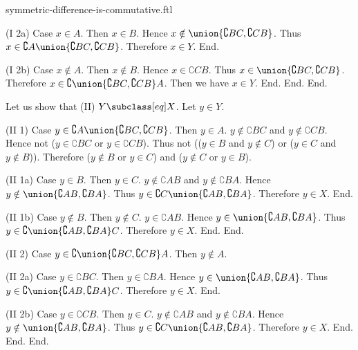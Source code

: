 \documentclass{article}
\begin{document}
\begin{smodule}[creators={Marcel Schütz}]{symmetric-difference-is-commutative.ftl}
\begin{fproof}
        (I 2a) Case $x \in A$.
          Then $x \in B$.
          Hence $x \notin \union{\complement{B}{C},\complement{C}{B}}$.
          Thus $x \in \complement{A}{\union{\complement{B}{C},\complement{C}{B}}}$.
          Therefore $x \in Y$.
        End.

        (I 2b) Case $x \notin A$.
          Then $x \notin B$.
          Hence $x \in \complement{C}{B}$.
          Thus $x \in \union{\complement{B}{C},\complement{C}{B}}$.
          Therefore $x \in \complement{\union{\complement{B}{C},\complement{C}{B}}}{A}$.
          Then we have $x \in Y$.
        End.
      End.
    End.

    Let us show that (II) $Y \subclass[eq] X$.
      Let $y \in Y$.

      (II 1) Case $y \in \complement{A}{\union{\complement{B}{C},\complement{C}{B}}}$.
        Then $y \in A$.
        $y \notin \complement{B}{C}$ and $y \notin \complement{C}{B}$.
        Hence not ($y \in \complement{B}{C}$ or $y \in \complement{C}{B}$).
        Thus not (($y \in B$ and $y \notin C$) or ($y \in C$ and $y \notin B$)).
        Therefore ($y \notin B$ or $y \in C$) and ($y \notin C$ or $y \in B$).

        (II 1a) Case $y \in B$.
          Then $y \in C$.
          $y \notin \complement{A}{B}$ and $y \notin \complement{B}{A}$.
          Hence $y \notin \union{\complement{A}{B},\complement{B}{A}}$.
          Thus $y \in \complement{C}{\union{\complement{A}{B},\complement{B}{A}}}$.
          Therefore $y \in X$.
        End.

        (II 1b) Case $y \notin B$.
          Then $y \notin C$.
          $y \in \complement{A}{B}$.
          Hence $y \in \union{\complement{A}{B},\complement{B}{A}}$.
          Thus $y \in \complement{\union{\complement{A}{B},\complement{B}{A}}}{C}$.
          Therefore $y \in X$.
        End.
      End.

      (II 2) Case $y \in \complement{\union{\complement{B}{C},\complement{C}{B}}}{A}$.
        Then $y \notin A$.

        (II 2a) Case $y \in \complement{B}{C}$.
          Then $y \in \complement{B}{A}$.
          Hence $y \in \union{\complement{A}{B},\complement{B}{A}}$.
          Thus $y \in \complement{\union{\complement{A}{B},\complement{B}{A}}}{C}$.
          Therefore $y \in X$.
        End.

        (II 2b) Case $y \in \complement{C}{B}$.
          Then $y \in C$.
          $y \notin \complement{A}{B}$ and $y \notin \complement{B}{A}$.
          Hence $y \notin \union{\complement{A}{B},\complement{B}{A}}$.
          Thus $y \in \complement{C}{\union{\complement{A}{B},\complement{B}{A}}}$.
          Therefore $y \in X$.
        End.
      End.
    End.
  \end{fproof}
\end{smodule}
\end{document}
